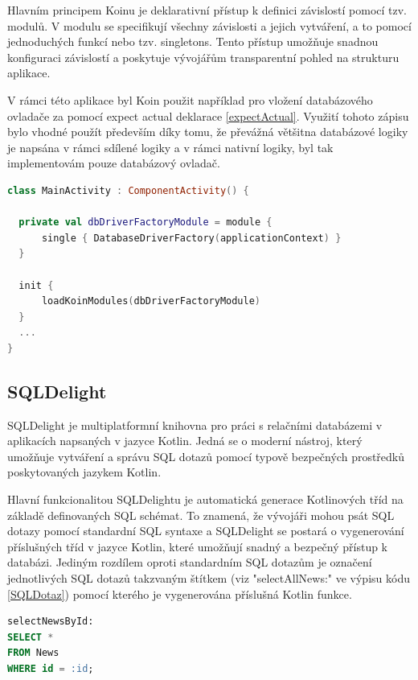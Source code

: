 Hlavním principem Koinu je deklarativní přístup k definici závislostí pomocí tzv. modulů. V modulu se specifikují všechny závislosti a 
jejich vytváření, a to pomocí jednoduchých funkcí nebo tzv. singletons. Tento přístup umožňuje snadnou konfiguraci závislostí a poskytuje
 vývojářům transparentní pohled na strukturu aplikace.

\bigskip

V rámci této aplikace byl Koin použit například pro vložení databázového ovladače za pomocí expect actual deklarace \ref{expectActual}.
Využití tohoto zápisu bylo vhodné použít především díky tomu, že převážná většitna databázové logiky je napsána v rámci sdílené 
logiky a v rámci nativní logiky, byl tak implementovám pouze databázový ovladač.

\begin{lstlisting}[caption={DI databázového ovladače pomocí Koinu}, label={lst:KoinInit}, language=Kotlin]
class MainActivity : ComponentActivity() {

  private val dbDriverFactoryModule = module {
      single { DatabaseDriverFactory(applicationContext) }
  }

  init {
      loadKoinModules(dbDriverFactoryModule)
  }
  ...
}
\end{lstlisting}

\subsection{SQLDelight}
SQLDelight je multiplatformní knihovna pro práci s relačními databázemi v aplikacích napsaných v jazyce Kotlin. Jedná se o moderní nástroj, 
který umožňuje vytváření a správu SQL dotazů pomocí typově bezpečných prostředků poskytovaných jazykem Kotlin.

Hlavní funkcionalitou SQLDelightu je automatická generace Kotlinových tříd na základě definovaných SQL schémat. To znamená, že vývojáři
 mohou psát SQL dotazy pomocí standardní SQL syntaxe a SQLDelight se postará o vygenerování příslušných tříd v jazyce Kotlin, které umožňují 
 snadný a bezpečný přístup k databázi. Jediným rozdílem oproti standardním SQL dotazům je označení jednotlivých SQL dotazů takzvaným 
 štítkem (viz "selectAllNews:" ve výpisu kódu \ref{SQLDotaz}) pomocí kterého je vygenerována příslušná Kotlin funkce. 

\begin{lstlisting}[caption={SQL dotaz}, label={lst:SQLDotaz}, language=SQL]
selectNewsById:
SELECT *
FROM News
WHERE id = :id;
\end{lstlisting}

